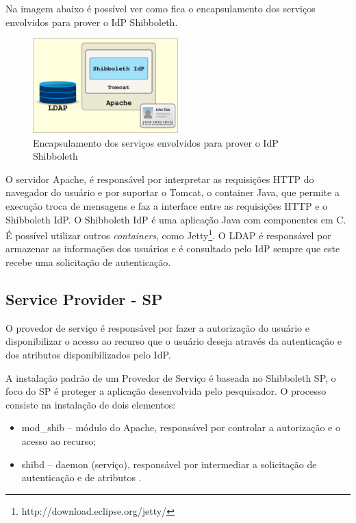 Na imagem abaixo é possível ver como fica o encapsulamento dos serviços envolvidos para prover o IdP Shibboleth. 

\begin{figure}[!htpb]
 \centering
 \includegraphics[width=0.5\textwidth]{figuras/vm-idp.png}
 \caption{Encapsulamento dos serviços envolvidos para prover o IdP Shibboleth}
 \label{fig_10}
\end{figure}

O servidor Apache, é responsável por interpretar as requisições HTTP do navegador do usuário e por suportar o Tomcat, o container Java, que permite a execução troca de mensagens e faz a interface entre as requisições HTTP e o Shibboleth IdP. O Shibboleth IdP é uma aplicação Java com componentes em C. É possível utilizar outros \textit{containers}, como Jetty\footnote{http://download.eclipse.org/jetty/}. O LDAP é responsável por armazenar as informações dos usuários e é consultado pelo IdP sempre que este recebe uma solicitação de autenticação.

\subsection{Service Provider - SP}
\label{ss_c4_inst_sp}

O provedor de serviço é responsável por fazer a autorização do usuário e disponibilizar o acesso ao recurso que o usuário deseja através da autenticação e dos atributos disponibilizados pelo IdP. 

A instalação padrão de um Provedor de Serviço é baseada no Shibboleth SP, o foco do SP é proteger a aplicação desenvolvida pelo pesquisador. O processo consiste na instalação de dois elementos:

\begin{itemize}
 \item mod\_shib -- módulo do Apache, responsável por controlar a autorização e o acesso ao recurso;
 \item shibd -- daemon (serviço), responsável por intermediar a solicitação de autenticação e de atributos \cite{moreira:11}.
\end{itemize}

